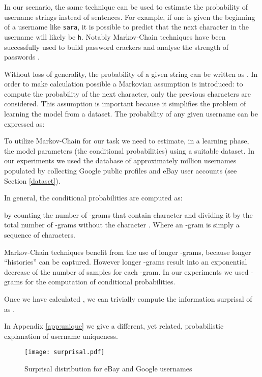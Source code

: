 \documentclass[letterpaper]{sig-alternate}
\begin{document}
In our scenario, the same technique can be used to estimate the probability of
username strings instead of sentences.  For example, if one is given the
beginning of a username like \texttt{sara}, it is possible to predict that the
next character in the username will likely be \texttt{h}.  Notably Markov-Chain
techniques have been successfully used to build password crackers \cite{Narayanan05fastdictionary}
and analyse the strength of passwords \cite{infocom10}.

Without loss of generality, the probability of a given string  can be written as 
.
In order to make calculation possible a Markovian assumption is introduced:
to compute the probability of the next character, only the previous 
characters are considered.  This assumption is important because it
simplifies the problem of learning the model from a dataset.  The
probability of any given username can be expressed as:



To utilize Markov-Chain for our task we need to estimate, in a learning phase,
the model parameters (the conditional probabilities) using a suitable dataset.
In our experiments we used the database of approximately  million
usernames populated by collecting Google public profiles and eBay user accounts
(see Section \ref{dataset}).

In general, the conditional probabilities are computed as: 

 by
counting the number of -grams that contain character  and dividing it
by the total number of -grams without the character .
Where an -gram is simply a sequence of  characters.

Markov-Chain techniques benefit from the use of longer -grams, because
longer ``histories'' can be captured. However longer -grams result into 
an exponential decrease of the number of samples for each -gram.
In our experiments we used -grams for the computation of conditional
probabilities. 

Once we have calculated , we can trivially compute the information
surprisal of  as .

In Appendix \ref{app:unique} we give a different, yet related, probabilistic explanation
of username uniqueness.



\begin{figure} [t] \centering
\texttt{[image: surprisal.pdf]}
\caption{Surprisal distribution for eBay and Google usernames}
\label{fig:surprisal}
\end{figure}
\end{document}

